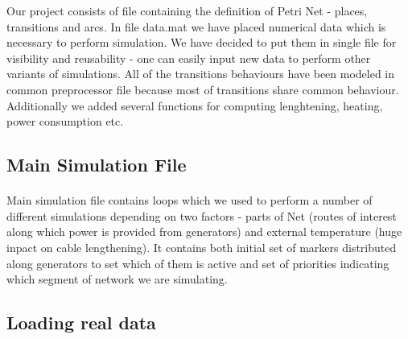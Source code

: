\documentclass[a4paper]{article}
\begin{document}

Our project consists of file containing the definition of Petri Net - places, transitions and arcs. In file data.mat we have placed numerical data which is necessary to perform simulation. We have decided to put them in single file for visibility and reusability - one can easily input new data to perform other variants of simulations. All of the transitions behaviours have been modeled in common preprocessor file because most of transitions share common behaviour. Additionally we added several functions for computing lenghtening, heating, power consumption etc.

\subsection{Main Simulation File}
\label{sec:mainSimulationFile}
\paragraph{}

Main simulation file contains loops which we used to perform a number of different simulations depending on two factors - parts of Net (routes of interest along which power is provided from generators) and external temperature (huge inpact on cable lengthening). It contains both initial set of markers distributed along generators to set which of them is active and set of priorities indicating which segment of network we are simulating.

\subsection{Loading real data}
\label{sec:loadingRealData}
\end{document}
